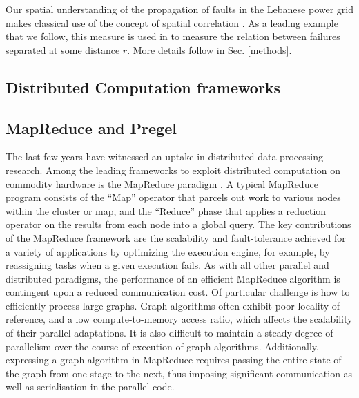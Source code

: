 Our spatial understanding of the propagation of faults in the Lebanese power grid makes classical use of the concept of spatial correlation \cite{CavagnaAl10, MakseAl95}. As a leading example that we follow, this measure is used in \cite{DaqingAl14} to measure the relation between failures separated at some distance $r$. More details follow in Sec. \ref{methods}.


\subsection{Distributed Computation frameworks}
\label{distcomp}

\subsection{MapReduce and Pregel}

The last few years have witnessed an uptake in distributed data processing research. Among the leading frameworks to exploit distributed computation on commodity hardware is the MapReduce paradigm \cite{mapreduce}. A typical MapReduce program consists of the ``Map'' operator that parcels out work to various nodes within the cluster or map, and the ``Reduce'' phase that applies a reduction operator on the results from each node into a global query. The key contributions of the MapReduce framework are the scalability and fault-tolerance achieved for a variety of applications by optimizing the execution engine, for example, by reassigning tasks when a given execution fails. As with all other parallel and distributed paradigms, the performance of an efficient MapReduce algorithm is contingent upon a reduced communication cost. Of particular challenge is how to efficiently process large graphs. Graph algorithms often exhibit poor locality of reference, and a low compute-to-memory access ratio, which affects the scalability of their parallel adaptations. It is also difficult to maintain a steady degree of parallelism over the course of execution of graph algorithms. Additionally, expressing a graph algorithm in MapReduce requires passing the entire state of the graph from one stage to the next, thus imposing significant communication as well as serialisation in the parallel code. 

